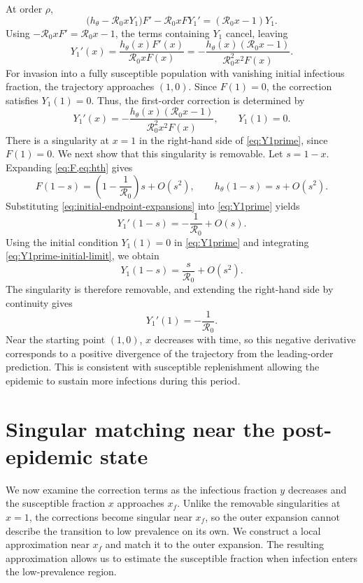 \documentclass[11pt]{article}
\newcommand{\Rzero}{\mathcal R_0}
\newcommand{\rhoeps}{\rho}
\newcommand{\hth}{h_\theta}
\newcommand{\xf}{x_f}
\begin{document}
At order \(\rhoeps\),
\[
\bigl(\hth-\Rzero xY_1\bigr)F'-\Rzero xF Y_1'
=(\Rzero x-1)Y_1.
\]
Using \(-\Rzero xF'=\Rzero x-1\), the terms containing \(Y_1\) cancel, leaving
\[
Y_1'(x)=\frac{\hth(x)F'(x)}{\Rzero xF(x)}
=-\frac{\hth(x)(\Rzero x-1)}{\Rzero^2x^2F(x)}.
\]
For invasion into a fully susceptible population with vanishing initial infectious fraction, the trajectory approaches \((1,0)\). Since \(F(1)=0\), the correction satisfies \(Y_1(1)=0\). Thus, the first-order correction is determined by
\begin{equation}
Y_1'(x)=-\frac{\hth(x)(\Rzero x-1)}{\Rzero^2x^2F(x)},
\qquad Y_1(1)=0.
\label{eq:Y1prime}
\end{equation}
There is a singularity at \(x=1\) in the right-hand side of \cref{eq:Y1prime}, since \(F(1)=0\). We next show that this singularity is removable. Let \(s=1-x\). Expanding \cref{eq:F,eq:hth} gives
\begin{equation}
F(1-s)=\left(1-\frac1{\Rzero}\right)s+O(s^2),
\qquad \hth(1-s)=s+O(s^2).
\label{eq:initial-endpoint-expansions}
\end{equation}
Substituting \cref{eq:initial-endpoint-expansions} into \cref{eq:Y1prime} yields
\begin{equation}
Y_1'(1-s)=-\frac1{\Rzero}+O(s).
\label{eq:Y1prime-initial-limit}
\end{equation}
Using the initial condition \(Y_1(1)=0\) in \cref{eq:Y1prime} and integrating \cref{eq:Y1prime-initial-limit}, we obtain
\[
Y_1(1-s)=\frac{s}{\Rzero}+O(s^2).
\]
The singularity is therefore removable, and extending the right-hand side by continuity gives
\begin{equation}
Y_1'(1)=-\frac1{\Rzero}.
\label{eq:first-order-endpoint-value}
\end{equation}
Near the starting point \((1,0)\), \(x\) decreases with time, so this negative derivative corresponds to a positive divergence of the trajectory from the leading-order prediction. This is consistent with susceptible replenishment allowing the epidemic to sustain more infections during this period.

\section{Singular matching near the post-epidemic state}
\label{sec:matching}
We now examine the correction terms as the infectious fraction \(y\) decreases and the susceptible fraction \(x\) approaches \(\xf\). Unlike the removable singularities at \(x=1\), the corrections become singular near \(\xf\), so the outer expansion cannot describe the transition to low prevalence on its own. We construct a local approximation near \(\xf\) and match it to the outer expansion. The resulting approximation allows us to estimate the susceptible fraction when infection enters the low-prevalence region.
\end{document}
